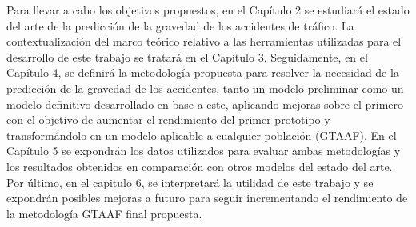 Para llevar a cabo los objetivos propuestos, en el Capítulo 2 se estudiará el estado del arte de la predicción de la gravedad de los accidentes de tráfico. La contextualización del marco teórico relativo a las herramientas utilizadas para el desarrollo de este trabajo se tratará en el Capítulo 3. Seguidamente, en el Capítulo 4, se definirá la metodología propuesta para resolver la necesidad de la predicción de la gravedad de los accidentes, tanto un modelo preliminar como un modelo definitivo desarrollado en base a este, aplicando mejoras sobre el primero con el objetivo de aumentar el rendimiento del primer prototipo y transformándolo en un modelo aplicable a cualquier población (GTAAF). En el Capítulo 5 se expondrán los datos utilizados para evaluar ambas metodologías y los resultados obtenidos en comparación con otros modelos del estado del arte. Por último, en el capitulo 6, se interpretará la utilidad de este trabajo y se expondrán posibles mejoras a futuro para seguir incrementando el rendimiento de la metodología GTAAF final propuesta.

